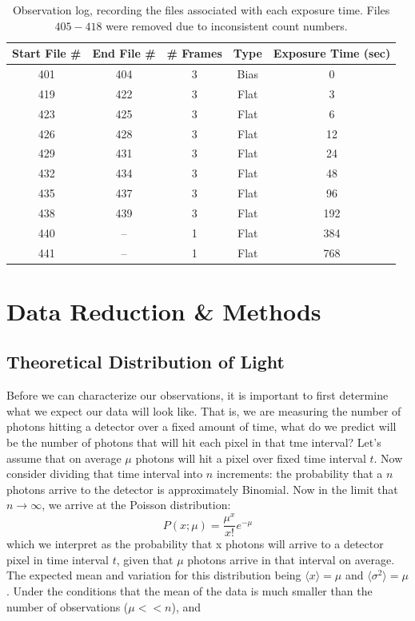 \documentclass[preprint]{aastex62}
\begin{document}
\begin{table}[ht]
\centering
\begin{tabular}{|c|c|c|c|c|}
    \hline
    Start File \# & End File \# & \# Frames & Type  & Exposure Time (sec) \\
    \hline
    \hline
    401 & 404 & 3 & Bias & 0  \\
    419 & 422 & 3 & Flat & 3 \\
    423 & 425 & 3 & Flat & 6 \\
    426 & 428 & 3 & Flat & 12 \\
    429 & 431 & 3 & Flat & 24 \\
    432 & 434 & 3 & Flat & 48 \\
    435 & 437 & 3 & Flat & 96 \\
    438 & 439 & 3 & Flat & 192 \\
    440 & --  & 1 & Flat & 384 \\
    441 & --  & 1 & Flat & 768 \\
    \hline
\end{tabular}
\caption{Observation log, recording the files associated with each exposure time. Files $405-418$ were removed due to inconsistent count numbers.}
\end{table}


\section{Data Reduction \& Methods}
\subsection{Theoretical Distribution of Light}
Before we can characterize our observations, it is important to first determine what we expect our data will look like. That is, we are measuring the number of photons hitting a detector over a fixed amount of time, what do we predict will be the number of photons that will hit each pixel in that tme interval? Let's assume that on average $\mu$ photons will hit a pixel over fixed time interval $t$. Now consider dividing that time interval into $n$ increments: the probability that a $n$ photons arrive to the detector is approximately Binomial. Now in the limit that $n\rightarrow\infty$, we arrive at the Poisson distribution:
\begin{equation}
P(x;\mu) = \frac{\mu^x}{x!}e^{-\mu}
\end{equation}
which we interpret as the probability that x photons will arrive to a detector pixel in time interval $t$, given that $\mu$ photons arrive in that interval on average. The expected mean and variation for this distribution being $\langle x \rangle = \mu$ and $\langle \sigma^2 \rangle = \mu$. Under the conditions that the mean of the data is much smaller than the number of observations ($\mu << n$), and 
\end{document}
